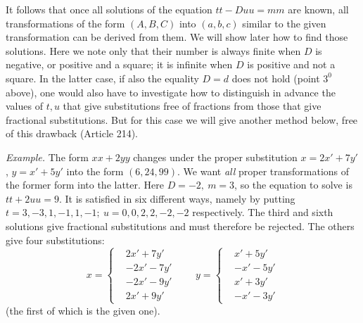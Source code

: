 It follows that once all solutions of the equation $tt-Duu=mm$ are known, all transformations of the form $(A,B,C)$ into $(a,b,c)$ similar to the given transformation can be derived from them. We will show later how to find those solutions. Here we note only that their number is always finite when $D$ is negative, or positive and a square; it is infinite when $D$ is positive and not a square. In the latter case, if also the equality $D$$=d$ does not hold (point $3^0$ above), one would also have to investigate how to distinguish in advance the values of $t,u$ that give substitutions free of fractions from those that give fractional substitutions. But for this case we will give another method below, free of this drawback (Article 214).

\textit{Example.} The form $xx+2yy$ changes under the proper substitution $x=2x'+7y'$, $y=x'+5y'$ into the form $(6,24,99)$. We want \textit{all} proper transformations of the former form into the latter. Here $D=-2,\ m=3$, so the equation to solve is $tt+2uu=9$. It is satisfied in six different ways, namely by putting $t=3,-3,1,-1,1,-1;\ u=0,0,2,2,-2,-2$ respectively. The third and sixth solutions give fractional substitutions and must therefore be rejected. The others give four substitutions:
\[
x=\left\{\begin{aligned}
&2x'+7y'\\
&-2x'-7y'\\
&-2x'-9y'\\
&2x'+9y'
\end{aligned}\right.
\qquad
y=\left\{\begin{aligned}
&x'+5y'\\
&-x'-5y'\\
&x'+3y'\\
&-x'-3y'
\end{aligned}\right.
\]
(the first of which is the given one).
